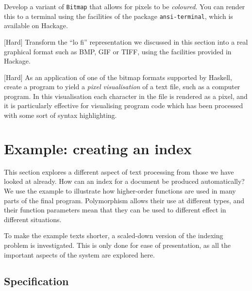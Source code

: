 \begin{exercises}

\item 
Develop a variant of \texttt{Bitmap} that allows for pixels to be \emph{coloured}. You can render this to a terminal using the facilities of the package \texttt{ansi-terminal}, which is available on Hackage.

\item {[Hard]}
Transform the ``lo fi'' representation we discussed in this section into a real graphical format such as BMP, GIF or TIFF, using the facilities provided in Hackage.


\item {[Hard]}
As an application of one of the bitmap formats supported by Haskell, create a program to yield a \emph{pixel visualisation} of a text file, such as a computer program. In this visualisation each character in the file is rendered as a pixel, and it is particularly effective for visualising program code which has been processed with some sort of syntax highlighting.


\end{exercises}





\section{Example: creating an index}
\label{indexExam}

This section explores a different aspect of text processing from those we have
looked at already. How can an index for a document be produced
automatically? We use the example to illustrate how higher-order functions are
used in many parts of the final program. Polymorphism allows their use at
different types, and their function parameters mean that they can be used to
different effect in different situations.

To make the example texts shorter, a
scaled-down version of the indexing problem is investigated. This is only
done for ease of presentation, as all the important aspects of the system
are explored here. 

\subsection*{Specification} 

